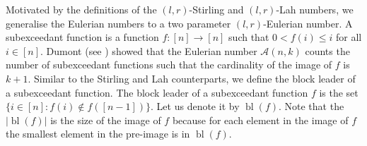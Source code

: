 \documentclass{article}
\newcommand{\eul}{\mathcal{A}}
\DeclareMathOperator{\bl}{bl}
\theoremstyle{definition}
\numberwithin{equation}{section}
\begin{document}
 Motivated by the definitions of the $(l,r)$-Stirling and $(l,r)$-Lah numbers, we generalise the Eulerian numbers to a two parameter $(l,r)$-Eulerian number. 
A subexceedant function is a function $f:[n]\rightarrow [n]$ such that $0<f(i)\le i$ for all $i\in [n]$. Dumont (see \cite{mantaci-fanja-perm-rep}) showed that the Eulerian number $\eul(n,k)$ counts the number of subexceedant functions such that the cardinality of the image of $f$ is $k+1$. Similar to the Stirling and Lah counterparts, we define the block leader of a subexceedant function. The block leader of a subexceedant function $f$ is the set $\{i\in [n]: f(i)\notin f([n-1])\}$. Let us denote it by $\bl(f)$. Note that the $|\bl(f)|$ is the size of the image of $f$ because for each element in the image of $f$ the smallest element in the pre-image is in $\bl(f)$.
\end{document}
